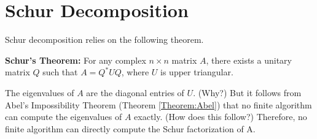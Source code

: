 \label{Ch:Jordan}


\section{Schur Decomposition}
Schur decomposition relies on the following theorem.


\begin{theorem}
{\bf Schur's Theorem:} For any complex \footnotemark $n \times n$ matrix $A$, there exists a unitary matrix $Q$ such that $A = Q^\ast U Q$, where $U$ is upper triangular.
\end{theorem}


The eigenvalues of $A$ are the diagonal entries of $U$. (Why?) But it follows from Abel's Impossibility Theorem (Theorem \ref{Theorem:Abel}) that no finite algorithm can compute the eigenvalues of $A$ exactly. (How does this follow?) Therefore, no finite algorithm can directly compute the Schur factorization of A.
